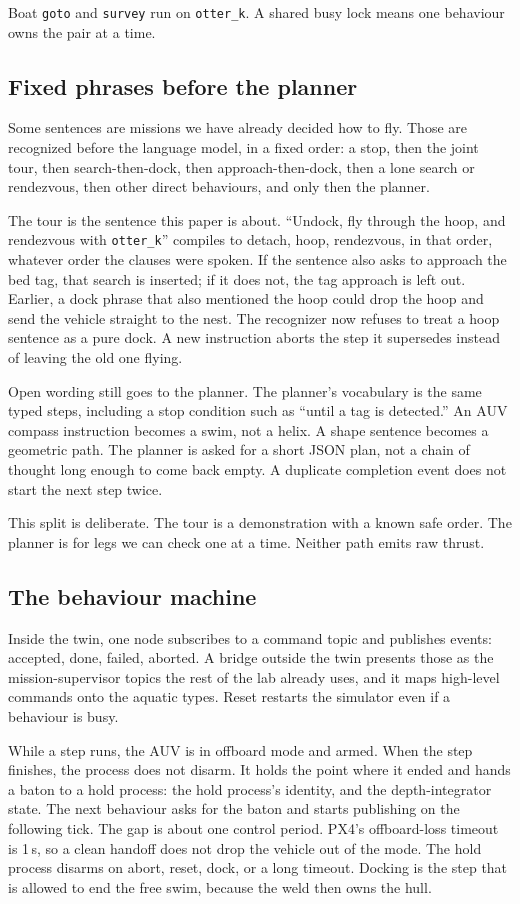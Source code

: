 \documentclass[conference]{IEEEtran}
\def\otterk{\texttt{otter\_k}}
\begin{document}
Boat \texttt{goto} and \texttt{survey} run on \otterk{}. A shared busy lock means one behaviour owns the pair at a time.

\subsection{Fixed phrases before the planner}
Some sentences are missions we have already decided how to fly. Those are recognized before the language model, in a fixed order: a stop, then the joint tour, then search-then-dock, then approach-then-dock, then a lone search or rendezvous, then other direct behaviours, and only then the planner.

The tour is the sentence this paper is about. ``Undock, fly through the hoop, and rendezvous with \otterk{}'' compiles to detach, hoop, rendezvous, in that order, whatever order the clauses were spoken. If the sentence also asks to approach the bed tag, that search is inserted; if it does not, the tag approach is left out. Earlier, a dock phrase that also mentioned the hoop could drop the hoop and send the vehicle straight to the nest. The recognizer now refuses to treat a hoop sentence as a pure dock. A new instruction aborts the step it supersedes instead of leaving the old one flying.

Open wording still goes to the planner. The planner's vocabulary is the same typed steps, including a stop condition such as ``until a tag is detected.'' An AUV compass instruction becomes a swim, not a helix. A shape sentence becomes a geometric path. The planner is asked for a short JSON plan, not a chain of thought long enough to come back empty. A duplicate completion event does not start the next step twice.

This split is deliberate. The tour is a demonstration with a known safe order. The planner is for legs we can check one at a time. Neither path emits raw thrust.

\subsection{The behaviour machine}
Inside the twin, one node subscribes to a command topic and publishes events: accepted, done, failed, aborted. A bridge outside the twin presents those as the mission-supervisor topics the rest of the lab already uses, and it maps high-level commands onto the aquatic types. Reset restarts the simulator even if a behaviour is busy.

While a step runs, the AUV is in offboard mode and armed. When the step finishes, the process does not disarm. It holds the point where it ended and hands a baton to a hold process: the hold process's identity, and the depth-integrator state. The next behaviour asks for the baton and starts publishing on the following tick. The gap is about one control period. PX4's offboard-loss timeout is 1\,s, so a clean handoff does not drop the vehicle out of the mode. The hold process disarms on abort, reset, dock, or a long timeout. Docking is the step that is allowed to end the free swim, because the weld then owns the hull.
\end{document}
